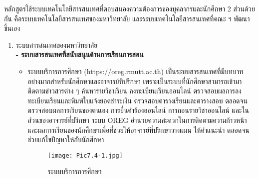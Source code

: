 หลักสูตรใช้ระบบเทคโนโลยีสารสนเทศที่ตอบสนองความต้องการของบุคลากรและนักศึกษา 2 ส่วนด้วยกัน คือระบบเทคโนโลยีสารสนเทศของมหาวิทยาลัย และระบบเทคโนโลยีสารสนเทศที่คณะ ฯ พัฒนาขึ้นเอง
\begin{enumerate}
\item ระบบสารสนเทศของมหาวิทยาลัย\\
\textbf{- ระบบสารสนเทศที่สนับสนุนด้านการเรียนการสอน}
\begin{itemize} 
\item ระบบบริการการศึกษา (https://oreg.rmutt.ac.th) เป็นระบบสารสนเทศที่มีบทบาทอย่างมากสำหรับนักศึกษาและอาจารย์ที่ปรึกษา เพราะเป็นระบบที่นักศึกษาสามารถเข้ามาติดตามข่าวสารต่าง ๆ ค้นหารายวิชาเรียน ลงทะเบียนเรียนออนไลน์ ตรวจสอบผลการลงทะเบียนเรียนและพิมพ์ใบแจ้งยอดชำระเงิน ตรวจสอบตารางเรียนและตารางสอบ ตลอดจนตรวจสอบผลการเรียนของตนเอง การยื่นคำร้องออนไลน์ การถอนรายวิชาออนไลน์ และในส่วนของอาจารย์ที่ปรึกษา ระบบ OREG อำนวยความสะดวกในการติดตามความก้าวหน้าและผลการเรียนของนักศึกษาเพื่อที่ช่วยให้อาจารย์ที่ปรึกษาวางแผน ให้คำแนะนำ ตลอดจนช่วยแก้ไขปัญหาให้กับนักศึกษา
	 \begin{figure}[H]
	\begin{center}
		\hspace*{1.5cm}
		\texttt{[image: Pic7.4-1.jpg]}\\
		\caption{ระบบบริการการศึกษา}
	\end{center}
\end{figure}


\end{itemize}
\end{enumerate}
